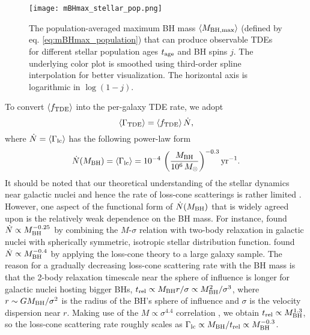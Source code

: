 \documentclass[useAMS,usenatbib]{mn2e}
\def\mBH{M_{\rm BH}}
\def\mBHmax{M_{\rm BH,\max}}
\def\GammaTDE{\Gamma_{\rm TDE}}
\def\Gammalc{\Gamma_{\rm lc}}
\def\fTDE{f_{\rm TDE}}
\def\tage{t_{\rm age}}
\newcommand{\lrb}[1]{\left({#1}\right)}
\newcommand{\lara}[1]{\left\langle{#1}\right\rangle}
\begin{document}
\begin{figure}
    \centering
    \texttt{[image: mBHmax\_stellar\_pop.png]}
    \caption{
    The population-averaged maximum BH mass $\lara{\mBHmax}$ (defined by eq. \ref{eq:mBHmax_population}) that can produce observable TDEs for different stellar population ages $\tage$ and BH spins $j$. The underlying color plot is smoothed using third-order spline interpolation for better visualization. The horizontal axis is logarithmic in $\log(1-j)$.
    }
    \label{fig:mBHmax_population}
\end{figure}

To convert $\lara{\fTDE}$ into the per-galaxy TDE rate, we adopt
\begin{equation}
    \lara{\GammaTDE}=\lara{\fTDE}\dot{N},
\end{equation}
where $\dot{N}=\lara{\Gammalc}$ has the following power-law form
\begin{equation}\label{eq:power-law_loss_cone_rate}
    \dot{N}(\mBH)= \lara{\Gammalc}=10^{-4}\,\lrb{\frac{\mBH}{10^6\,M_\odot}}^{-0.3}{\rm yr}^{-1}.
\end{equation}
It should be noted that our theoretical understanding of the stellar dynamics near galactic nuclei and hence the rate of loss-cone scatterings is rather limited \citep[with a number of major uncertainties, see][for a recent review]{stone20_TDE_rate_review}. However, one aspect of the functional form of $\dot{N}(\mBH)$ that is widely agreed upon is the relatively weak dependence on the BH mass. For instance, \citet{wang04_TDE_rate} found $\dot{N}\propto \mBH^{-0.25}$ by combining the $M$-$\sigma$ relation with two-body relaxation in galactic nuclei with spherically symmetric, isotropic stellar distribution function. \citet{stone16_TDE_rate} found $\dot{N}\propto \mBH^{-0.4}$ by applying the loss-cone theory to a large galaxy sample. The reason for a gradually decreasing loss-cone scattering rate with the BH mass is that the 2-body relaxation timescale near the sphere of influence is longer for galactic nuclei hosting bigger BHs, $t_{\rm rel}\propto \mBH r/\sigma\propto \mBH^2/\sigma^3$, where $r\sim G\mBH/\sigma^2$ is the radius of the BH's sphere of influence and $\sigma$ is the velocity dispersion near $r$. Making use of the $M\propto\sigma^{4.4}$ correlation \citep{kormendy13_scaling_relations}, we obtain $t_{\rm rel}\propto \mBH^{1.3}$, so the loss-cone scattering rate roughly scales as $\Gammalc\propto \mBH/t_{\rm rel}\propto \mBH^{-0.3}$.
\end{document}
